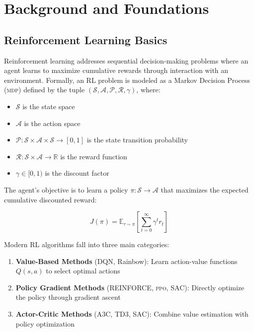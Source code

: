 \documentclass[11pt,a4paper]{article}
\newcommand{\mdp}{\textsc{mdp}}
\newcommand{\ppo}{\textsc{ppo}}
\begin{document}
\section{Background and Foundations}
\label{sec:background}

\subsection{Reinforcement Learning Basics}
\label{sec:rl_basics}

Reinforcement learning addresses sequential decision-making problems where an agent learns to maximize cumulative rewards through interaction with an environment. Formally, an RL problem is modeled as a Markov Decision Process (\mdp{}) defined by the tuple $(\mathcal{S}, \mathcal{A}, \mathcal{P}, \mathcal{R}, \gamma)$, where:

\begin{itemize}[leftmargin=*]
    \item $\mathcal{S}$ is the state space
    \item $\mathcal{A}$ is the action space
    \item $\mathcal{P}: \mathcal{S} \times \mathcal{A} \times \mathcal{S} \rightarrow [0,1]$ is the state transition probability
    \item $\mathcal{R}: \mathcal{S} \times \mathcal{A} \rightarrow \mathbb{R}$ is the reward function
    \item $\gamma \in [0,1)$ is the discount factor
\end{itemize}

The agent's objective is to learn a policy $\pi: \mathcal{S} \rightarrow \mathcal{A}$ that maximizes the expected cumulative discounted reward:

\begin{equation}
J(\pi) = \mathbb{E}_{\tau \sim \pi} \left[ \sum_{t=0}^{\infty} \gamma^t r_t \right]
\label{eq:objective}
\end{equation}

Modern RL algorithms fall into three main categories:

\begin{enumerate}[leftmargin=*]
    \item \textbf{Value-Based Methods} (DQN, Rainbow): Learn action-value functions $Q(s,a)$ to select optimal actions
    \item \textbf{Policy Gradient Methods} (REINFORCE, \ppo{}, SAC): Directly optimize the policy through gradient ascent
    \item \textbf{Actor-Critic Methods} (A3C, TD3, SAC): Combine value estimation with policy optimization
\end{enumerate}
\end{document}
